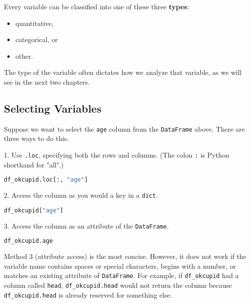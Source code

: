 Every variable can be classified into one of these three \textbf{types}:
\begin{itemize}
\item 
quantitative,

\item 
categorical, or

\item 
other.

\end{itemize}

The type of the variable often dictates how we analyze that variable, as we will see in the next two chapters.



\subsection{Selecting Variables}\label{1.3.2}

Suppose we want to select the \verb|age| column from the \verb|DataFrame| above. There are three ways to do this.



1.  Use \verb|.loc|, specifying both the rows and columns. (The colon \verb|:| is Python shorthand for "all".)

\begin{lstlisting}[language=Python]
df_okcupid.loc[:, "age"]
\end{lstlisting}




2. Access the column as you would a key in a \verb|dict|.

\begin{lstlisting}[language=Python]
df_okcupid["age"]
\end{lstlisting}




3. Access the column as an attribute of the \verb|DataFrame|.

\begin{lstlisting}[language=Python]
df_okcupid.age
\end{lstlisting}




Method 3 (attribute access) is the most concise. However, it does not work if the variable name contains spaces or special characters, begins with a number, or matches an existing attribute of \verb|DataFrame|. For example, if \verb|df_okcupid| had a column called \verb|head|, \verb|df_okcupid.head| would not return the column because \verb|df_okcupid.head| is already reserved for something else.



